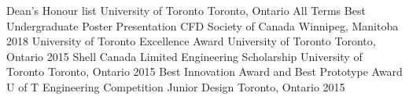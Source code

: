 \begin{cvhonors}
\cvhonor
    {Dean's Honour list}
    {University of Toronto}
    {Toronto, Ontario}
    {All Terms}
\cvhonor
    {Best Undergraduate Poster Presentation}
    {CFD Society of Canada}
    {Winnipeg, Manitoba}
    {2018}  
\cvhonor
    {University of Toronto Excellence Award}
    {University of Toronto}
    {Toronto, Ontario}
    {2015}   
\cvhonor
    {Shell Canada Limited Engineering Scholarship}
    {University of Toronto}
    {Toronto, Ontario}
    {2015}      
\cvhonor
    {Best Innovation Award and Best Prototype Award}
    {U of T Engineering Competition Junior Design}
    {Toronto, Ontario}
    {2015}    
\end{cvhonors}
